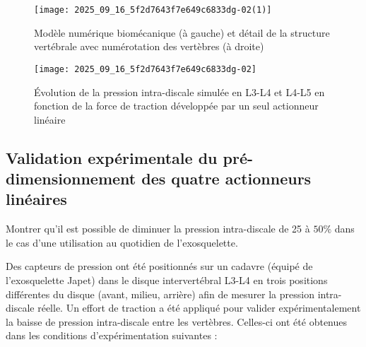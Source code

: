 
\begin{figure}[!h]
\centering
\texttt{[image: 2025\_09\_16\_5f2d7643f7e649c6833dg-02(1)]}
\caption{\label{ccs_mp_2023_fig_02}  Modèle numérique biomécanique (à gauche) et détail de la structure vertébrale avec numérotation des vertèbres (à droite)}
\end{figure}



%

\begin{figure}[!h]
\centering
\texttt{[image: 2025\_09\_16\_5f2d7643f7e649c6833dg-02]}
\caption{\label{ccs_mp_2023_fig_03}  Évolution de la pression intra-discale simulée en L3-L4 et L4-L5 en fonction de la force de traction développée par un seul actionneur linéaire}
\end{figure}




\subsection{Validation expérimentale du pré-dimensionnement des quatre actionneurs linéaires}
\begin{obj}
Montrer qu'il est possible de diminuer la pression intra-discale de 25 à $50 \%$ dans le cas d'une utilisation au quotidien de l'exosquelette.
\end{obj}

Des capteurs de pression ont été positionnés sur un cadavre (équipé de l'exosquelette Japet) dans le disque intervertébral L3-L4 en trois positions différentes du disque (avant, milieu, arrière) afin de mesurer la pression intra-discale réelle. Un effort de traction a été appliqué pour valider expérimentalement la baisse de pression intra-discale entre les vertèbres. Celles-ci ont été obtenues dans les conditions d'expérimentation suivantes :

